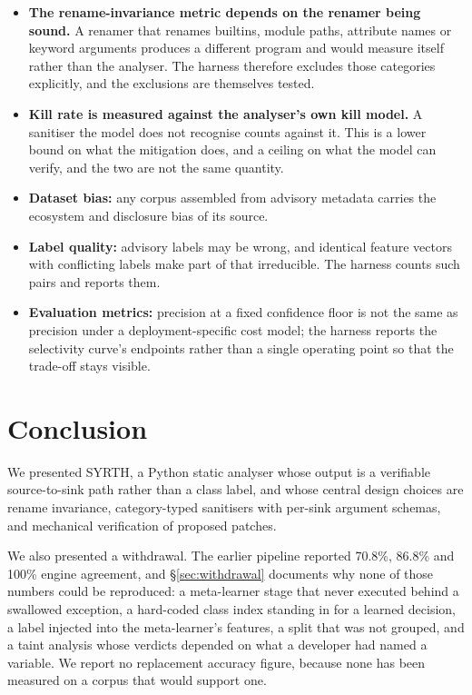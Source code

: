 \documentclass[12pt,a4paper]{article}
\begin{document}
\begin{itemize}
    \item \textbf{The rename-invariance metric depends on the renamer being sound.}
    A renamer that renames builtins, module paths, attribute names or keyword
    arguments produces a different program and would measure itself rather than
    the analyser. The harness therefore excludes those categories explicitly, and
    the exclusions are themselves tested.
    \item \textbf{Kill rate is measured against the analyser's own kill model.}
    A sanitiser the model does not recognise counts against it. This is a lower
    bound on what the mitigation does, and a ceiling on what the model can verify,
    and the two are not the same quantity.
    \item \textbf{Dataset bias:} any corpus assembled from advisory metadata carries
    the ecosystem and disclosure bias of its source.
    \item \textbf{Label quality:} advisory labels may be wrong, and identical
    feature vectors with conflicting labels make part of that irreducible. The
    harness counts such pairs and reports them.
    \item \textbf{Evaluation metrics:} precision at a fixed confidence floor is not
    the same as precision under a deployment-specific cost model; the harness
    reports the selectivity curve's endpoints rather than a single operating
    point so that the trade-off stays visible.
\end{itemize}

\section{Conclusion}
\label{sec:conclusion}

We presented SYRTH, a Python static analyser whose output is a verifiable
source-to-sink path rather than a class label, and whose central design choices
are rename invariance, category-typed sanitisers with per-sink argument schemas,
and mechanical verification of proposed patches.

We also presented a withdrawal. The earlier pipeline reported 70.8\%, 86.8\% and
100\% engine agreement, and \S\ref{sec:withdrawal} documents why none of those
numbers could be reproduced: a meta-learner stage that never executed behind a
swallowed exception, a hard-coded class index standing in for a learned decision,
a label injected into the meta-learner's features, a split that was not grouped,
and a taint analysis whose verdicts depended on what a developer had named a
variable. We report no replacement accuracy figure, because none has been
measured on a corpus that would support one.
\end{document}
